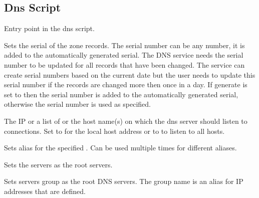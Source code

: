 \subsection{Dns Script}



Entry point in the dns script.


Sets the serial  of the zone records.
The serial number can be any number, it is added to the automatically
generated serial. The DNS service needs the serial number to be updated
for all records that have been changed. The service can create serial
numbers based on the current date but the user needs to update this
serial number if the records are changed more then once in a day.
If generate is set to  then the serial number is added to
the automatically generated serial, otherwise the serial number is used 
as specified.

\TheStatement*[dns!bind]{bind [address: [local|all|\Arg{address}] [, addresses: \Arg{addresses}]}

The IP  or a list of  or the host name(s) 
on which the dns server should listen to connections. Set to 
for the local host address  or to  to listen to all
hosts.


Sets alias  for the specified . Can be used multiple times
for different aliases.


Sets the servers as the root servers.


Sets servers group  as the root DNS servers. The group name is
an alias for IP addresses that are defined.


